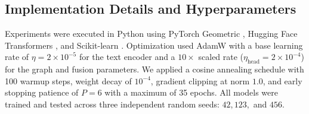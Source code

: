 \documentclass[conference]{IEEEtran}
\begin{document}
\subsection{Implementation Details and Hyperparameters}
Experiments were executed in Python using PyTorch Geometric \cite{fey2019pyg}, Hugging Face Transformers \cite{wolf2020transformers}, and Scikit-learn \cite{pedregosa2011scikit}. Optimization used AdamW \cite{loschilov2019adamw} with a base learning rate of $\eta = 2 \times 10^{-5}$ for the text encoder and a $10\times$ scaled rate ($\eta_{\text{head}} = 2 \times 10^{-4}$) for the graph and fusion parameters. We applied a cosine annealing schedule with 100 warmup steps, weight decay of $10^{-4}$, gradient clipping at norm $1.0$, and early stopping patience of $P=6$ with a maximum of 35 epochs. All models were trained and tested across three independent random seeds: $42, 123,$ and $456$.
\end{document}
